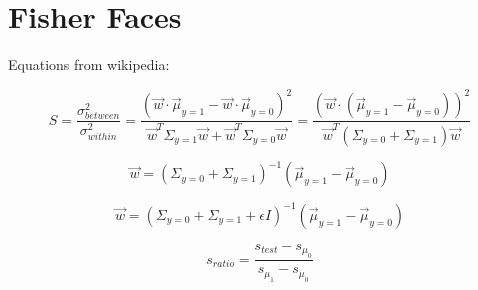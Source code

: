 \section{Fisher Faces}

Equations from wikipedia:

\begin{equation}
S=\frac{\sigma_{between}^2}{\sigma_{within}^2}= \frac{(\vec w \cdot \vec \mu_{y=1} - \vec w \cdot \vec \mu_{y=0})^2}{\vec w^T \Sigma_{y=1} \vec w + \vec w^T \Sigma_{y=0} \vec w} = \frac{(\vec w \cdot (\vec \mu_{y=1} - \vec \mu_{y=0}))^2}{\vec w^T (\Sigma_{y=0}+\Sigma_{y=1}) \vec w}
\end{equation}

\begin{equation}
\vec w = (\Sigma_{y=0}+\Sigma_{y=1})^{-1}(\vec \mu_{y=1} - \vec \mu_{y=0})
\end{equation}

\begin{equation}
\vec w = (\Sigma_{y=0} + \Sigma_{y=1} + \epsilon I)^{-1}(\vec \mu_{y=1} - \vec \mu_{y=0})
\end{equation}


\begin{equation}
s_{ratio} = \frac{s_{test} - s_{\mu_0}}{s_{\mu_1} - s_{\mu_0}}
\end{equation}



% 
% 
  
